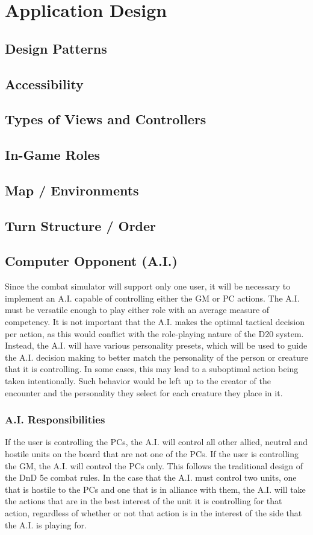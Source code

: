 \documentclass[12pt,a4paper]{report}
\begin{document}
\chapter*{Application Design}
	\section{Design Patterns}
	\section{Accessibility}
	\section{Types of Views and Controllers}
	\section{In-Game Roles}
	\section{Map / Environments}
	\section{Turn Structure / Order}
	\section{Computer Opponent (A.I.)}
	Since the combat simulator will support only one user, it will be necessary to implement an A.I. capable of controlling either the GM or PC actions. The A.I. must be versatile enough to play either role with an average measure of competency. It is not important that the A.I. makes the optimal tactical decision per action, as this would conflict with the role-playing nature of the D20 system. Instead, the A.I. will have various personality presets, which will be used to guide the A.I. decision making to better match the personality of the person or creature that it is controlling. In some cases, this may lead to a suboptimal action being taken intentionally. Such behavior would be left up to the creator of the encounter and the personality they select for each creature they place in it.
	
		\subsection{A.I. Responsibilities}
		If the user is controlling the PCs, the A.I. will control all other allied, neutral and hostile units on the board that are not one of the PCs. If the user is controlling the GM, the A.I. will control the PCs only. This follows the traditional design of the DnD 5e combat rules. In the case that the A.I. must control two units, one that is hostile to the PCs and one that is in alliance with them, the A.I. will take the actions that are in the best interest of the unit it is controlling for that action, regardless of whether or not that action is in the interest of the side that the A.I. is playing for. 
		
\end{document}
